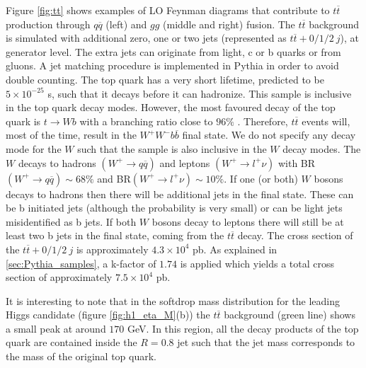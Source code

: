 Figure \ref{fig:tt} shows examples of LO Feynman diagrams that contribute to $t\overline{t}$ production through $q\overline{q}$ (left) and $gg$ (middle and right) fusion. The $t\overline{t}$ background is simulated with additional zero, one or two jets (represented as $t\overline{t}+0/1/2 ~j$), at generator level. The extra jets can originate from light, c or b quarks or from gluons. A jet matching procedure is implemented in Pythia in order to avoid double counting. The top quark has a very short lifetime, predicted to be $5\times 10^{-25}$ s, such that it decays before it can hadronize. This sample is inclusive in the top quark decay modes. However, the most favoured decay of the top quark is $t\rightarrow Wb$ with a branching ratio close to $96\%$ \cite{PDG2016}. Therefore, $t\overline{t}$ events will, most of the time, result in the $W^+W^-b\overline{b}$ final state. We do not specify any decay mode for the $W$ such that the sample is also inclusive in the $W$ decay modes. The $W$ decays to hadrons $(W^+\rightarrow q\overline{q})$ and leptons $(W^+\rightarrow l^+\nu)$ with BR$(W^+\rightarrow q\overline{q})\sim 68\%$ and BR$(W^+\rightarrow l^+\nu)\sim 10\%$. If one (or both) $W$ bosons decays to hadrons then there will be additional jets in the final state. These can be b initiated jets (although the probability is very small) or can be light jets misidentified as b jets. If both $W$ bosons decay to leptons there will still be at least two b jets in the final state, coming from the $t\overline{t}$ decay. The cross section of the $t\overline{t}+0/1/2 ~j$ is approximately $4.3\times 10^4$ pb. As explained in \ref{sec:Pythia_samples}, a k-factor of $1.74$ is applied which yields a total cross section of approximately $7.5\times 10^{4}$ pb.

It is interesting to note that in the softdrop mass distribution for the leading Higgs candidate (figure \ref{fig:h1_eta_M}(b)) the $t\overline{t}$ background (green line) shows a small peak at around $170$ GeV. In this region, all the decay products of the top quark are contained inside the $R=0.8$ jet such that the jet mass corresponds to the mass of the original top quark.



